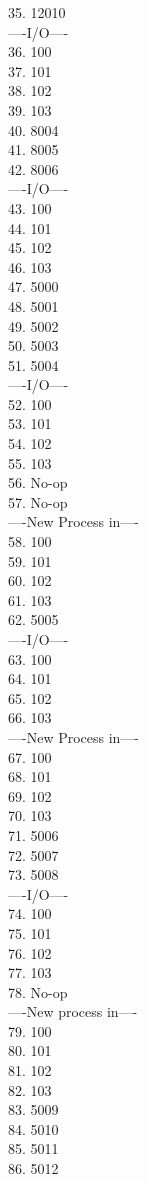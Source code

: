 \documentclass[12pt]{article}
\begin{document}
35. 12010\\
----I/O----\\
36. 100\\
37. 101\\
38. 102\\
39. 103\\
40. 8004\\
41. 8005\\
42. 8006\\
----I/O----\\
43. 100\\
44. 101\\
45. 102\\
46. 103\\
47. 5000\\
48. 5001\\
49. 5002\\
50. 5003\\
51. 5004\\
----I/O----\\
52. 100\\
53. 101\\
54. 102\\
55. 103\\
56. No-op\\
57. No-op\\
----New Process in----\\
58. 100\\
59. 101\\
60. 102\\
61. 103\\
62. 5005\\
----I/O----\\
63. 100\\
64. 101\\
65. 102\\
66. 103\\
----New Process in----\\
67. 100\\
68. 101\\
69. 102\\
70. 103\\
71. 5006\\
72. 5007\\
73. 5008\\
----I/O----\\
74. 100\\
75. 101\\
76. 102\\
77. 103\\
78. No-op\\
----New process in----\\
79. 100\\
80. 101\\
81. 102\\
82. 103\\
83. 5009\\
84. 5010\\
85. 5011\\
86. 5012\\
\end{document}
